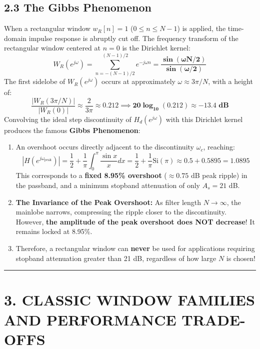 \documentclass[11pt,a4paper]{article}
\begin{document}
\subsection{2.3 The Gibbs Phenomenon}
When a rectangular window $w_R[n] = 1$ ($0 \le n \le N-1$) is applied, the time-domain impulse response is abruptly cut off. The frequency transform of the rectangular window centered at $n = 0$ is the Dirichlet kernel:
\begin{equation}
W_R(e^{j\omega}) = \sum_{n=-(N-1)/2}^{(N-1)/2} e^{-j\omega n} = \mathbf{\frac{\sin(\omega N / 2)}{\sin(\omega / 2)}}
\label{eq:dirichlet}
\end{equation}
The first sidelobe of $W_R(e^{j\omega})$ occurs at approximately $\omega \approx 3\pi/N$, with a height of:
\begin{equation}
\frac{|W_R(3\pi/N)|}{|W_R(0)|} \approx \frac{2}{3\pi} \approx 0.212 \implies \mathbf{20\log_{10}(0.212) \approx -13.4 \text{ dB}}
\end{equation}
Convolving the ideal step discontinuity of $H_d(e^{j\omega})$ with this Dirichlet kernel produces the famous \textbf{Gibbs Phenomenon}:
\begin{enumerate}
    \item An overshoot occurs directly adjacent to the discontinuity $\omega_c$, reaching:
    \begin{equation}
    |H(e^{j\omega_{\text{peak}}})| = \frac{1}{2} + \frac{1}{\pi} \int_0^\pi \frac{\sin x}{x} dx = \frac{1}{2} + \frac{1}{\pi} \text{Si}(\pi) \approx 0.5 + 0.5895 = \mathbf{1.0895}
    \end{equation}
    This corresponds to a \textbf{fixed 8.95\% overshoot} ($\approx 0.75$ dB peak ripple) in the passband, and a minimum stopband attenuation of only $A_s = 21$ dB.
    \item \textbf{The Invariance of the Peak Overshoot:}
    As filter length $N \to \infty$, the mainlobe narrows, compressing the ripple closer to the discontinuity. However, \textbf{the amplitude of the peak overshoot does NOT decrease}! It remains locked at 8.95\%.
    \item Therefore, a rectangular window can \textbf{never} be used for applications requiring stopband attenuation greater than 21 dB, regardless of how large $N$ is chosen!
\end{enumerate}

\noindent\rule{\textwidth}{0.5pt}

\section{3. CLASSIC WINDOW FAMILIES AND PERFORMANCE TRADE-OFFS}
\end{document}
